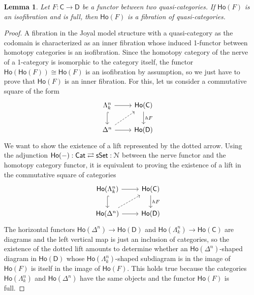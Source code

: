\documentclass{proc-l}
\newcommand{\ho}[1]{\mathsf{Ho}(#1)}
\renewcommand{\mathcal}{\EuScript}
\theoremstyle{plain}
\newtheorem{lemma}[{theorem}]{Lemma}
\theoremstyle{definition}
\theoremstyle{remark}
\begin{document}
\begin{lemma}%
\label{Lemma:B.3}\label{lemma:nerveofhF}
Let $F:\mathsf{C}\rightarrow\mathsf{D}$ be a functor between two quasi-categories. If $\ho{F}$ is an isofibration and is full, then $\ho{F}$ is a fibration of quasi-categories.
\end{lemma}
\begin{proof}
A fibration in the Joyal model structure with a quasi-category as the codomain is characterized as an inner fibration whose induced 1-functor between homotopy categories is an isofibration. Since the homotopy category of the nerve of a 1-category is isomorphic to the category itself, the functor $\ho{\ho{F}}\cong \ho F$ is an isofibration by assumption, so we just have to prove that $\ho{F}$ is an inner fibration. For this, let us consider a commutative square of the form
\[
\begin{tikzcd}
\Lambda^n_k
\arrow[d, hook]
\arrow[r]
& \ho{\mathsf{C}}
\arrow[d, "hF"] \\
\Delta^n
\arrow[r]
\arrow[ur, dashed]
& \ho{\mathsf{D}}
\end{tikzcd}
\]
We want to show the existence of a lift represented by the dotted arrow. Using the adjunction $\ho{-}: \mathsf{Cat} \rightleftarrows \mathsf{sSet}: \mathcal{N}$ between the nerve functor and the homotopy category functor, it is equivalent to proving the existence of a lift in the commutative square of categories
\[
\begin{tikzcd}
\ho{\Lambda^n_k}
\arrow[d, hook]
\arrow[r]
&\ho{\mathsf{C}}
\arrow[d, "hF"] \\
\ho{\Delta^n}
\arrow[r]
\arrow[ur, dashed]
&\ho{\mathsf{D}}
\end{tikzcd}
\]
The horizontal functors $\ho{\Delta^n} \longrightarrow \ho{\mathsf{D}}$ and $\ho{\Lambda^n_k} \longrightarrow \ho{\mathsf{C}}$ are diagrams and the left vertical map is just an inclusion of categories, so the existence of the dotted lift amounts to determine whether an $\ho{\Delta^n}$-shaped diagram in $\ho{\mathsf{D}}$ whose $\ho{\Lambda^n_k}$-shaped subdiagram is in the image of $\ho{F}$ is itself in the image of $\ho{F}$. This holds true because the categories $\ho{\Lambda^n_k}$ and $\ho{\Delta^n}$ have the same objects and the functor $\ho{F}$ is full.
\end{proof}
\end{document}
